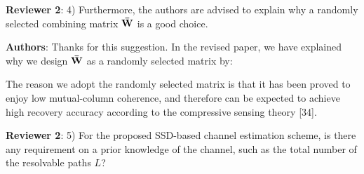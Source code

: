 \documentclass[a4paper,12pt]{article}
\begin{document}
\textbf{Reviewer 2}: 4) Furthermore, the authors are advised to explain why a randomly selected combining matrix ${{\bf{\bar W}}}$ is a good choice.

{\color{blue} \textbf{Authors}: Thanks for this suggestion. In the revised paper, we have explained why we design ${{\bf{\bar W}}}$ as a randomly selected matrix by:
\begin{framed}
{\color{red} The reason we adopt the randomly selected matrix is that it has been proved to enjoy low mutual-column coherence, and therefore can be expected to achieve high recovery accuracy according to the compressive sensing theory [34].}
\end{framed}

}

\textbf{Reviewer 2}: 5) For the proposed SSD-based channel estimation scheme, is there any requirement on a prior knowledge of the channel, such as the total number of the resolvable paths ${L}$?
\end{document}
